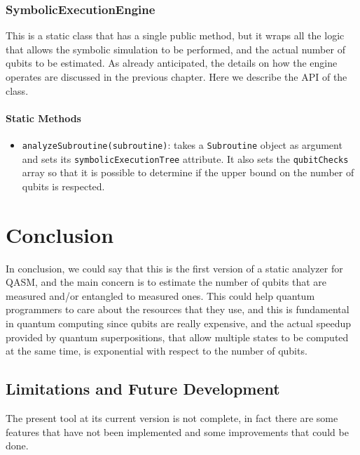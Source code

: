\documentclass[12pt,a4paper]{report}
\theoremstyle{definition}
\theoremstyle{definition}
\theoremstyle{definition}
\begin{document}
\subsection{SymbolicExecutionEngine}
This is a static class that has a single public method, but it wraps all the logic that allows the symbolic simulation to be performed, and the actual number of qubits to be estimated. As already anticipated, the details on how the engine operates are discussed in the previous chapter. Here we describe the API of the class.
\subsubsection{Static Methods}
\begin{itemize}
    \itemsep 0em
    \item \texttt{analyzeSubroutine(subroutine)}: takes a \texttt{Subroutine} object as argument and sets its \texttt{symbolicExecutionTree} attribute. It also sets the \texttt{qubitChecks} array so that it is possible to determine if the upper bound on the number of qubits is respected.
\end{itemize}





\chapter{Conclusion}
In conclusion, we could say that this is the first version of a static analyzer for QASM, and the main concern is to estimate the number of qubits that are measured and/or entangled to measured ones. This could help quantum programmers to care about the resources that they use, and this is fundamental in quantum computing since qubits are really expensive, and the actual speedup provided by quantum superpositions, that allow multiple states to be computed at the same time, is exponential with respect to the number of qubits.


\section{Limitations and Future Development}
The present tool at its current version is not complete, in fact there are some features that have not been implemented and some improvements that could be done.
\end{document}
